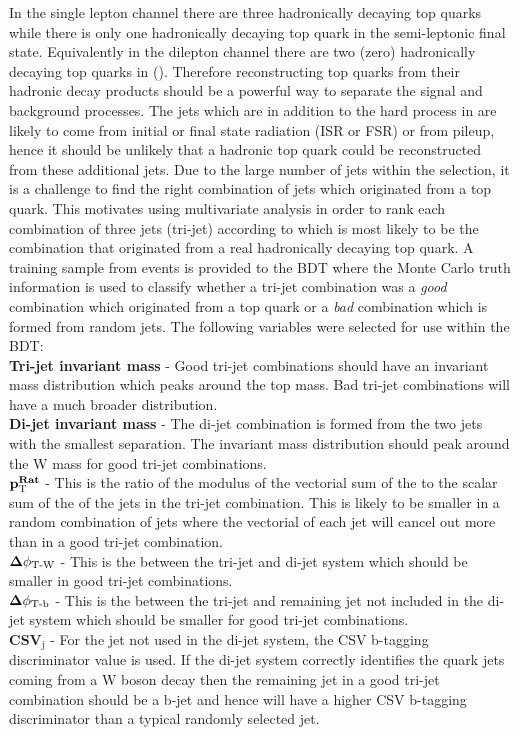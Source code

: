 In the \tttt single lepton channel there are three hadronically decaying top quarks while there is only one hadronically decaying top quark in the semi-leptonic \ttbar final state. Equivalently in the dilepton channel there are two (zero) hadronically decaying top quarks in \tttt (\ttbar). Therefore reconstructing top quarks from their hadronic decay products should be a powerful way to separate the signal and background processes. The jets which are in addition to the hard process in \ttbar are likely to come from initial or final state radiation (ISR or FSR) or from pileup, hence it should be unlikely that a hadronic top quark could be reconstructed from these additional jets. Due to the large number of jets within the selection, it is a challenge to find the right combination of jets which originated from a top quark. This motivates using multivariate analysis in order to rank each combination of three jets (tri-jet) according to which is most likely to be the combination that originated from a real hadronically decaying top quark.
A training sample from \ttbar events is provided to the BDT where the Monte Carlo truth information is used to classify whether a tri-jet combination was a \emph{good} combination which originated from a top quark or a \emph{bad} combination which is formed from random jets. The following variables were selected for use within the BDT:\\
\textbf{Tri-jet invariant mass} - Good tri-jet combinations should have an invariant mass distribution which peaks around the top mass.
Bad tri-jet combinations will have a much broader distribution. \\
\textbf{Di-jet invariant mass} - The di-jet combination is formed from the two jets with the smallest \DR separation. The invariant mass distribution should peak around the W mass for good tri-jet combinations.\\
$\mathbf{p_{\mathrm{T}}^{Rat}}$ - This is the ratio of the modulus of the vectorial sum of the \pt to the scalar sum of the \pt of the jets in the tri-jet combination. This is likely to be smaller in a random combination of jets where the vectorial \pt of each jet will cancel out more than in a good tri-jet combination.\\
$\mathbf{\Delta {\phi_{\textrm{T-W}}}}$ - This is the \Dphi between the tri-jet and di-jet system which should be smaller in good tri-jet combinations.\\
$\mathbf{\Delta {\phi_{\textrm{T-b}}}}$ - This is the \Dphi between the tri-jet and remaining jet not included in the di-jet system which should be smaller for good tri-jet combinations.\\
\textbf{CSV}$_{\textrm{j}}$ - For the jet not used in the di-jet system, the CSV b-tagging discriminator value is used. If the di-jet system correctly identifies the quark jets coming from a W boson decay then the remaining jet in a good tri-jet combination should be a b-jet and hence will have a higher CSV b-tagging discriminator than a typical randomly selected jet.\\


